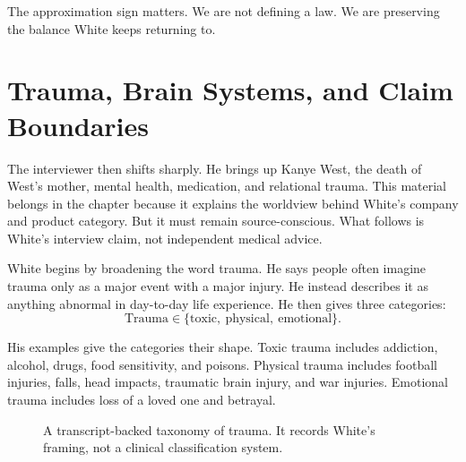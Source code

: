 The approximation sign matters. We are not defining a law. We are preserving the balance White keeps returning to.

\section{Trauma, Brain Systems, and Claim Boundaries}

The interviewer then shifts sharply. He brings up Kanye West, the death of West's mother, mental health, medication, and relational trauma. This material belongs in the chapter because it explains the worldview behind White's company and product category. But it must remain source-conscious. What follows is White's interview claim, not independent medical advice.

White begins by broadening the word trauma. He says people often imagine trauma only as a major event with a major injury. He instead describes it as anything abnormal in day-to-day life experience. He then gives three categories:
\begin{equation}
\text{Trauma}\in
\{\text{toxic},\ \text{physical},\ \text{emotional}\}.
\end{equation}

His examples give the categories their shape. Toxic trauma includes addiction, alcohol, drugs, food sensitivity, and poisons. Physical trauma includes football injuries, falls, head impacts, traumatic brain injury, and war injuries. Emotional trauma includes loss of a loved one and betrayal.

\begin{figure}
\centering
{}
\caption{A transcript-backed taxonomy of trauma. It records White's framing, not a clinical classification system.}
\end{figure}

